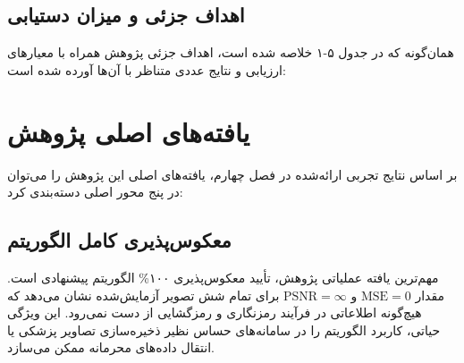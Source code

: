 \subsection{اهداف جزئی و میزان دستیابی}

همان‌گونه که در جدول ۵-۱ خلاصه شده است، اهداف جزئی پژوهش همراه با معیارهای ارزیابی و نتایج عددی متناظر با آن‌ها آورده شده است:

\begin{table}[htbp]
\centering
\small
{}
\caption{ارزیابی میزان تحقق اهداف جزئی پژوهش بر اساس نتایج تجربی}
\label{tab:ch5_objectives}
\end{table}

\section{یافته‌های اصلی پژوهش}

بر اساس نتایج تجربی ارائه‌شده در فصل چهارم، یافته‌های اصلی این پژوهش را می‌توان در پنج محور اصلی دسته‌بندی کرد:

\subsection{معکوس‌پذیری کامل الگوریتم}

مهم‌ترین یافته عملیاتی پژوهش، تأیید معکوس‌پذیری ۱۰۰\% الگوریتم پیشنهادی است. مقدار $\mathrm{MSE}=0$ و $\mathrm{PSNR}=\infty$ برای تمام شش تصویر آزمایش‌شده نشان می‌دهد که هیچ‌گونه اطلاعاتی در فرآیند رمزنگاری و رمزگشایی از دست نمی‌رود. این ویژگی حیاتی، کاربرد الگوریتم را در سامانه‌های حساس نظیر ذخیره‌سازی تصاویر پزشکی یا انتقال داده‌های محرمانه ممکن می‌سازد.

